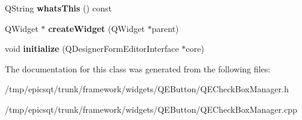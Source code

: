\begin{DoxyCompactItemize}
\item 
\hypertarget{classQECheckBoxManager_a8052463a91b378c0502af5b3ae177872}{
QString {\bfseries whatsThis} () const }
\label{classQECheckBoxManager_a8052463a91b378c0502af5b3ae177872}

\item 
\hypertarget{classQECheckBoxManager_a397b0b0dec2335f2d1c162158c0c0f60}{
QWidget $\ast$ {\bfseries createWidget} (QWidget $\ast$parent)}
\label{classQECheckBoxManager_a397b0b0dec2335f2d1c162158c0c0f60}

\item 
\hypertarget{classQECheckBoxManager_aa924fb8861b0db0a16753a8e33dce017}{
void {\bfseries initialize} (QDesignerFormEditorInterface $\ast$core)}
\label{classQECheckBoxManager_aa924fb8861b0db0a16753a8e33dce017}

\end{DoxyCompactItemize}


The documentation for this class was generated from the following files:\begin{DoxyCompactItemize}
\item 
/tmp/epicsqt/trunk/framework/widgets/QEButton/QECheckBoxManager.h\item 
/tmp/epicsqt/trunk/framework/widgets/QEButton/QECheckBoxManager.cpp\end{DoxyCompactItemize}
